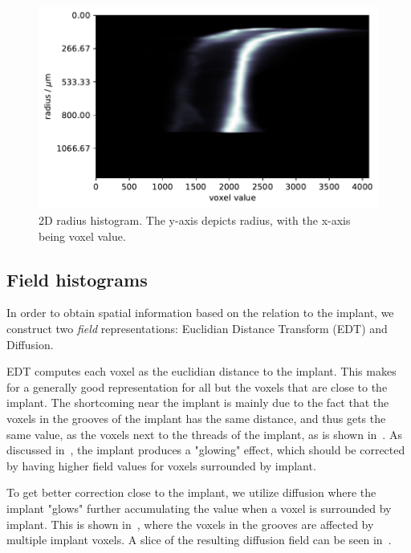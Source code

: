 \begin{figure}
    \centering
    \includegraphics[width=\linewidth]{figures/rb-bone_region3.pdf}
    \caption{2D radius histogram. The y-axis depicts radius, with the x-axis being voxel value.}
    \label{fig:2dhists}
\end{figure}

\subsection{Field histograms}
In order to obtain spatial information based on the relation to the implant, we construct two \textit{field} representations: Euclidian Distance Transform (EDT) and Diffusion.

EDT computes each voxel as the euclidian distance to the implant. 
This makes for a generally good representation for all but the voxels that are close to the implant.
The shortcoming near the implant is mainly due to the fact that the voxels in the grooves of the implant has the same distance, and thus gets the same value, as the voxels next to the threads of the implant, as is shown in~.
As discussed in~, the implant produces a "glowing" effect, which should be corrected by having higher field values for voxels surrounded by implant.

To get better correction close to the implant, we utilize diffusion where the implant "glows" further accumulating the value when a voxel is surrounded by implant.
This is shown in~, where the voxels in the grooves are affected by multiple implant voxels.
A slice of the resulting diffusion field can be seen in~.

